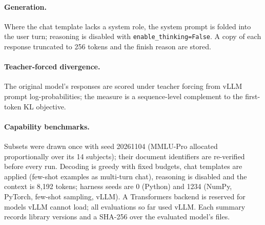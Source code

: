 \paragraph{Generation.} Where the chat template lacks a system role, the system
prompt is folded into the user turn; reasoning is disabled with
\texttt{enable\_thinking=False}. A copy of each response truncated to 256
tokens and the finish reason are stored.

\paragraph{Teacher-forced divergence.} The original model's responses are
scored under teacher forcing from vLLM prompt log-probabilities; the measure is
a sequence-level complement to the first-token KL objective.

\paragraph{Capability benchmarks.} Subsets were drawn
once with seed 20261104 (MMLU-Pro allocated proportionally over its 14
subjects); their document identifiers are re-verified before every run.
Decoding is greedy with fixed budgets, chat templates are applied (few-shot
examples as multi-turn chat), reasoning is disabled and the context is 8{,}192
tokens; harness seeds are 0 (Python) and 1234 (NumPy, PyTorch, few-shot
sampling, vLLM). A Transformers backend is reserved for models vLLM cannot load;
all evaluations so far used vLLM. Each summary records library versions and
a SHA-256 over the evaluated model's files.

